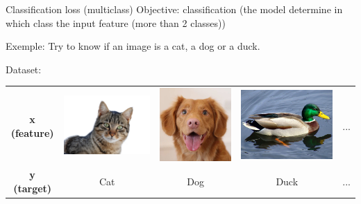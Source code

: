\documentclass[handout]{beamer}
\begin{document}
\begin{frame}{Classification loss (multiclass)}
Objective:  classification (the model determine in which class the input feature (more than 2 classes))\\
\vspace{1em}

Exemple: Try to know if an image is a cat, a dog or a duck.\\
\vspace{1em}

Dataset:

\begin{table}[]
    \centering
    \begin{tabular}{ccccc}
        {\bf x (feature)} &
         \includegraphics[width=.2\textwidth]{fig/L2/cat1.jpg}& 
         \includegraphics[width=.2\textwidth]{fig/L2/dog1.jpg}&
         \includegraphics[width=.2\textwidth]{fig/L2/duck1.jpg}&
         ...
         \\
        {\bf y (target)} & Cat & Dog & Duck & ...\\
    \end{tabular}
\end{table}

\end{frame}
\end{document}
